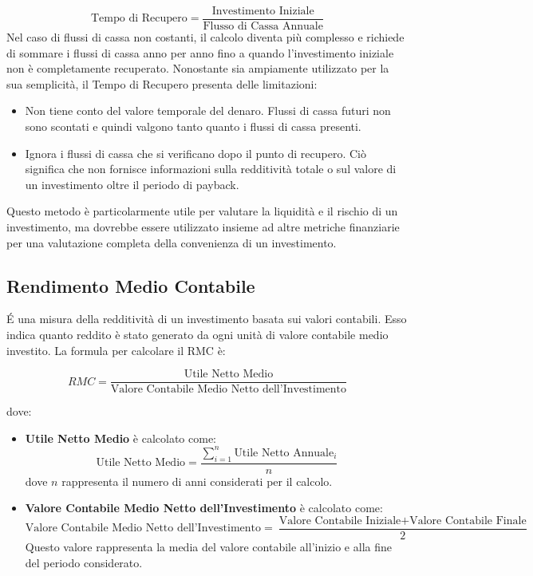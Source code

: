 \documentclass{article}
\begin{document}
\[
    \text{Tempo di Recupero} = \frac{\text{Investimento Iniziale}}{\text{Flusso di Cassa Annuale}}
\]
Nel caso di flussi di cassa non costanti, il calcolo diventa più complesso e richiede di sommare i flussi di cassa anno per anno fino a quando l'investimento iniziale non è completamente recuperato.
Nonostante sia ampiamente utilizzato per la sua semplicità, il Tempo di Recupero presenta delle limitazioni:
\begin{itemize}
    \item Non tiene conto del valore temporale del denaro. Flussi di cassa futuri non sono scontati e quindi valgono tanto quanto i flussi di cassa presenti.
    \item Ignora i flussi di cassa che si verificano dopo il punto di recupero. Ciò significa che non fornisce informazioni sulla redditività totale o sul valore di un investimento oltre il periodo di payback.
\end{itemize}
Questo metodo è particolarmente utile per valutare la liquidità e il rischio di un investimento, ma dovrebbe essere utilizzato insieme ad altre metriche finanziarie per una valutazione completa della convenienza di un investimento.
\subsection*{Rendimento Medio Contabile}
\'E una misura della redditività di un investimento basata sui valori contabili. Esso indica quanto reddito è stato generato da ogni unità di valore contabile medio investito. La formula per calcolare il RMC è:

\[
    RMC = \frac{\text{Utile Netto Medio}}{\text{Valore Contabile Medio Netto dell'Investimento}}
\]

dove:
\begin{itemize}
    \item \textbf{Utile Netto Medio} è calcolato come:
          \[
              \text{Utile Netto Medio} = \frac{\sum_{i=1}^{n} \text{Utile Netto Annuale}_i}{n}
          \]
          dove $n$ rappresenta il numero di anni considerati per il calcolo.

    \item \textbf{Valore Contabile Medio Netto dell'Investimento} è calcolato come:
          \[
              \text{Valore Contabile Medio Netto dell'Investimento} = \frac{\text{Valore Contabile Iniziale} + \text{Valore Contabile Finale}}{2}
          \]
          Questo valore rappresenta la media del valore contabile all'inizio e alla fine del periodo considerato.
\end{itemize}
\newpage
\end{document}
